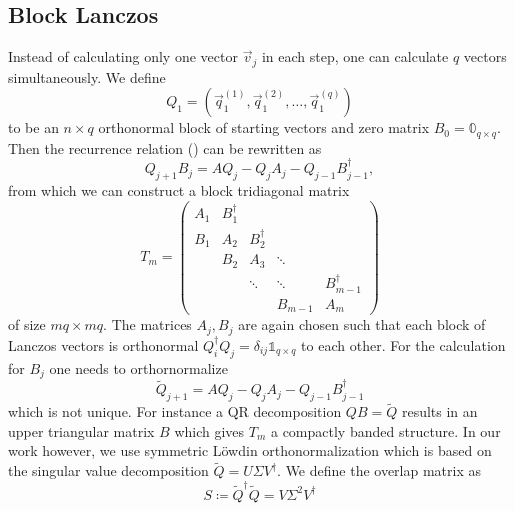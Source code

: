 \subsection{Block Lanczos}

Instead of calculating only one vector $\vec{v}_j$ in each step,
one can calculate $q$ vectors simultaneously.
We define
\begin{equation}
    Q_1 = (\vec{q}_1^{(1)}, \vec{q}_1^{(2)}, \ldots, \vec{q}_1^{(q)})
\end{equation}
to be an
$n\times q$ orthonormal block of starting vectors
and zero matrix $B_0 = \mathbb{0}_{q\times q}$.
Then the recurrence relation () can be rewritten as
\begin{equation}
    Q_{j+1} B_j = A Q_j - Q_j A_j - Q_{j-1} B_{j-1}^\dag,
    \label{eq:block-Lanczos-recurrence}
\end{equation}
from which we can construct a block tridiagonal matrix
\begin{equation}
    T_m
    =
    \begin{pmatrix}
        A_1 & B_1^\dag &          &         &              \\
        B_1 & A_2      & B_2^\dag &         &              \\
            & B_2      & A_3      & \ddots  &              \\
            &          & \ddots   & \ddots  & B_{m-1}^\dag \\
            &          &          & B_{m-1} & A_m
    \end{pmatrix}
\end{equation}
of size $mq\times mq$.
The matrices $A_j, B_j$ are again chosen such that each block of Lanczos vectors is orthonormal
$Q_i^\dag Q_j = \delta_{ij}\mathbb{1}_{q\times q}$ to each other.
For the calculation for $B_j$ one needs to orthornormalize
\begin{equation}
    \tilde Q_{j+1} = A Q_j - Q_j A_j - Q_{j-1} B_{j-1}^\dag
\end{equation}
which is not unique.
For instance a QR decomposition \cite{Cullum1985, Grimes1994} $Q B = \tilde{Q}$
results in an upper triangular matrix $B$ which gives $T_m$ a compactly banded structure.
In our work however, we use symmetric Löwdin orthonormalization \cite{Lowdin1950, Brass2021}
which is based on the singular value decomposition $\tilde Q = U \Sigma V^\dag$.
We define the overlap matrix as
\begin{equation}
    S \coloneqq \tilde Q^\dag \tilde Q = V \Sigma^{2} V^\dagger
\end{equation}
